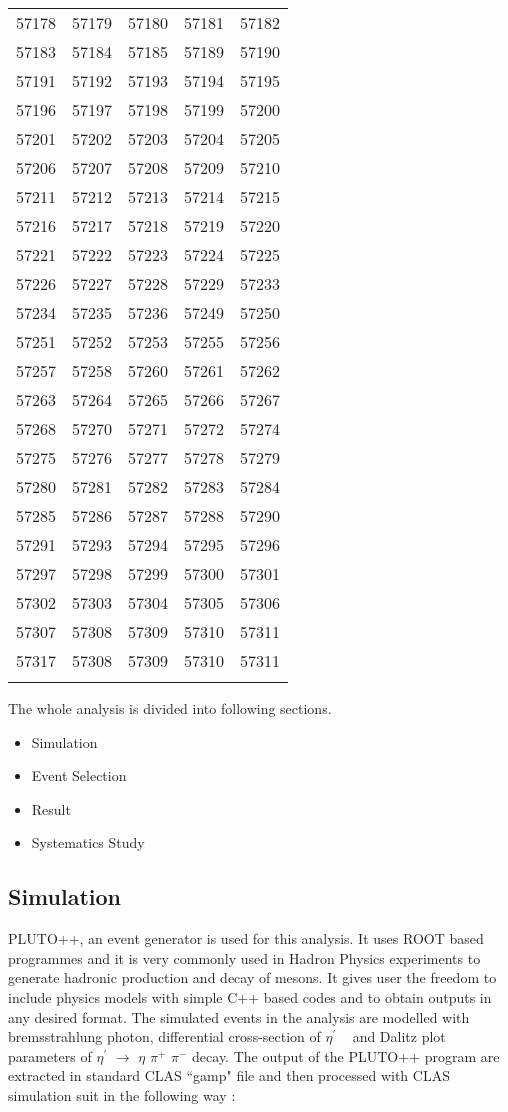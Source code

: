 \begin{longtable}{|c|c|c|c|c|}
57178&57179&57180&57181&57182\\ 
57183&57184&57185&57189&57190\\ 
57191&57192&57193&57194&57195\\ 
57196&57197&57198&57199&57200\\ 
57201&57202&57203&57204&57205\\ 
57206&57207&57208&57209&57210\\ 
57211&57212&57213&57214&57215\\ 
57216&57217&57218&57219&57220\\ 
57221&57222&57223&57224&57225\\ 
57226&57227&57228&57229&57233\\ 
57234&57235&57236&57249&57250\\ 
57251&57252&57253&57255&57256\\ 
57257&57258&57260&57261&57262\\ 
57263&57264&57265&57266&57267\\ 
57268&57270&57271&57272&57274\\ 
57275&57276&57277&57278&57279\\ 
57280&57281&57282&57283&57284\\ 
57285&57286&57287&57288&57290\\ 
57291&57293&57294&57295&57296\\ 
57297&57298&57299&57300&57301\\ 
57302&57303&57304&57305&57306\\ 
57307&57308&57309&57310&57311\\ 
57317&57308&57309&57310&57311\\ 
\hline
\label{RunList}
\end{longtable}


The whole analysis is divided into following sections.
\begin {itemize}
\item Simulation 
\item Event Selection 
\item Result 
\item Systematics Study
\end {itemize}



\subsection{Simulation}
\label{Sim}
PLUTO++, an event generator is used for this analysis. It uses ROOT based programmes and it is very commonly used in Hadron Physics experiments to generate hadronic production and decay of mesons. It gives user the freedom to include physics models with simple C++ based codes and to obtain outputs in any desired format. The simulated events in the analysis are modelled with bremsstrahlung photon, differential cross-section of $\eta^{\prime}$ ~\cite{Williams:2009yj} and Dalitz plot parameters of $\eta^{\prime}$ $\rightarrow$ $\eta$ $\pi^{+}$ $\pi^{-}$ decay. The output of the PLUTO++ program are extracted in standard CLAS ``gamp" file and then processed with CLAS simulation suit in the following way :

